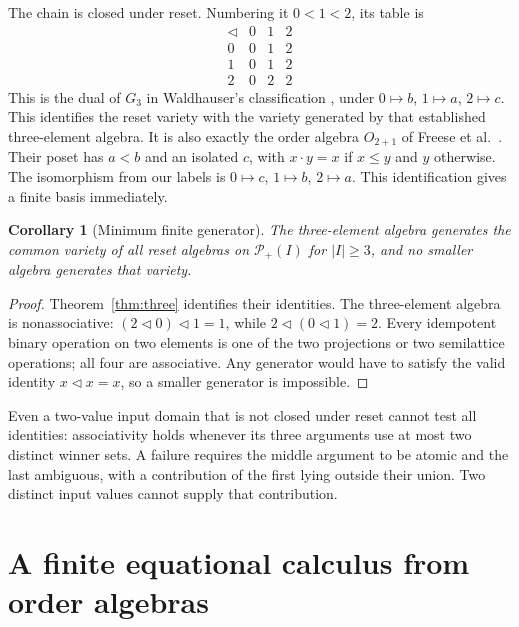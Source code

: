 \documentclass[11pt]{article}
\newtheorem{corollary}[theorem]{Corollary}
\newcommand{\Pow}{\mathcal P_+}
\newcommand{\del}{\mathbin{\triangleleft}}
\begin{document}
The chain is closed under reset. Numbering it $0<1<2$, its table is
\begin{equation}\label{eq:three-table}
\begin{array}{c|ccc}
\del&0&1&2\\\hline
0&0&1&2\\
1&0&1&2\\
2&0&2&2
\end{array}
\end{equation}
This is the dual of $G_3$ in Waldhauser's classification
\cite[Theorem~3.4, table $G_3$]{Waldhauser2006}, under
$0\mapsto b$, $1\mapsto a$, $2\mapsto c$.
This identifies the reset variety with the variety generated by that
established three-element algebra.
It is also exactly the order algebra $O_{2+1}$ of
Freese et al.\ \cite[Section~3]{FreeseEtAl2002}. Their poset has $a<b$
and an isolated $c$, with $x\cdot y=x$ if $x\leq y$ and $y$ otherwise.
The isomorphism from our labels is $0\mapsto c$, $1\mapsto b$,
$2\mapsto a$. This identification gives a finite basis immediately.

\begin{corollary}[Minimum finite generator]
The three-element algebra generates the common variety of all reset
algebras on $\Pow(I)$ for $|I|\geq3$, and no smaller algebra generates
that variety.
\end{corollary}
\begin{proof}
Theorem~\ref{thm:three} identifies their identities. The three-element
algebra is nonassociative:
$(2\del0)\del1=1$, while $2\del(0\del1)=2$.
Every idempotent binary operation on two elements is one of the two
projections or two semilattice operations; all four are associative.
Any generator would have to satisfy the valid identity $x\del x=x$,
so a smaller generator is impossible.
\end{proof}

Even a two-value input domain that is not closed under reset cannot
test all identities: associativity holds whenever its three arguments
use at most two distinct winner sets. A failure requires the middle
argument to be atomic and the last ambiguous, with a contribution of
the first lying outside their union. Two distinct input values cannot
supply that contribution.

\section{A finite equational calculus from order algebras}
\end{document}
